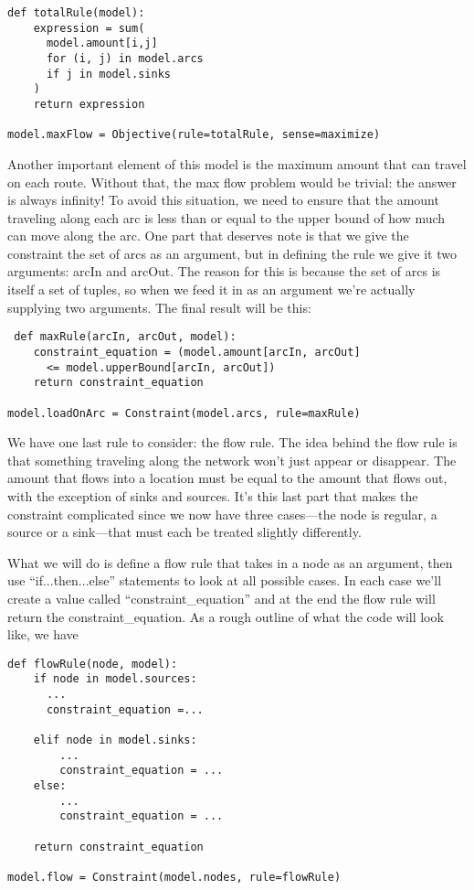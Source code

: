 \documentclass{article}
\begin{document}
\begin{verbatim}
def totalRule(model):
    expression = sum(
      model.amount[i,j]
      for (i, j) in model.arcs
      if j in model.sinks
    )
    return expression

model.maxFlow = Objective(rule=totalRule, sense=maximize)
\end{verbatim}

Another important element of this model is the maximum amount that can travel on each route.  Without that, the max flow problem would be trivial: the answer is always infinity!  To avoid this situation, we need to ensure that the amount traveling along each arc is less than or equal to the upper bound of how much can move along the arc.  One part that deserves note is that we give the constraint the set of arcs as an argument, but in defining the rule we give it two arguments: arcIn and arcOut.  The reason for this is because the set of arcs is itself a set of tuples, so when we feed it in as an argument we're actually supplying two arguments.  The final result will be this:

\begin{verbatim}
 def maxRule(arcIn, arcOut, model):
    constraint_equation = (model.amount[arcIn, arcOut] 
      <= model.upperBound[arcIn, arcOut])
    return constraint_equation

model.loadOnArc = Constraint(model.arcs, rule=maxRule)
\end{verbatim}

We have one last rule to consider: the flow rule.  The idea behind the flow rule is that something traveling along the network won't just appear or disappear.  The amount that flows into a location must be equal to the amount that flows out, with the exception of sinks and sources.  It's this last part that makes the constraint complicated since we now have three cases---the node is regular, a source or a sink---that must each be treated slightly differently.

What we will do is define a flow rule that takes in a node as an argument, then use ``if...then...else'' statements to look at all possible cases.  In each case we'll create a value called ``constraint\_equation'' and at the end the flow rule will return the constraint\_equation.  As a rough outline of what the code will look like, we have

\begin{verbatim}
def flowRule(node, model):
    if node in model.sources:
      ...
      constraint_equation =...
    
    elif node in model.sinks:
        ...
        constraint_equation = ...
    else:
        ...
        constraint_equation = ...
    
    return constraint_equation

model.flow = Constraint(model.nodes, rule=flowRule)
\end{verbatim}
\end{document}

